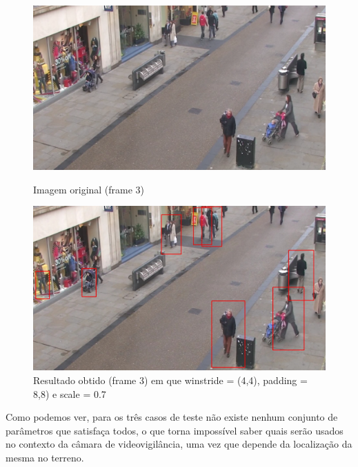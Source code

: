 \begin{figure}[h]
	\centering
	\begin{minipage}[b]{0.49\textwidth}
		\centering
		\includegraphics[width=\textwidth]{img/vision/exemplos/frame3.png}
		\caption[Imagem original (frame 3)]{Imagem original (frame 3) \newline \newline}
		\label{bluetth05-res}
	\end{minipage}
	\hfill
	\begin{minipage}[b]{0.49\textwidth}
		\centering
		\includegraphics[width=\textwidth]{img/vision/exemplos/result_frame3.jpg}
		\caption[Resultado obtido (frame 3)]{Resultado obtido (frame 3) em que winstride = (4,4), padding = 8,8) e scale = 0.7}
		\label{comimageesqu1ema}
	\end{minipage}
\end{figure}



Como podemos ver, para os três casos de teste não existe nenhum conjunto de parâmetros que satisfaça todos, o que torna impossível saber quais serão usados no contexto da câmara de videovigilância, uma vez que depende da localização da mesma no terreno.  



